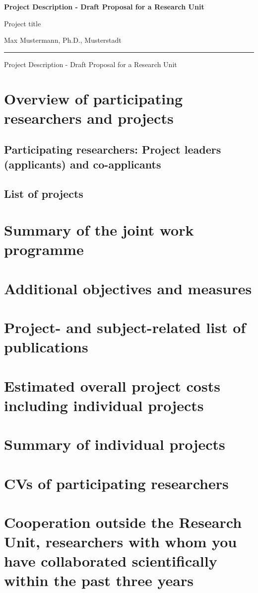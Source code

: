 \documentclass{scrartcl}
\newcommand{\spokesperson}{Max Mustermann, Ph.D., Musterstadt}
\newcommand{\project}{Project title}
\begin{document}
{\raggedright{} \normalsize \bfseries
	Project Description - Draft Proposal for a Research Unit \par
    \project{} \par
    \spokesperson{} \par
	\rule{\textwidth}{0.5pt} \par
	Project Description - Draft Proposal for a Research Unit
}

\section{Overview of participating researchers and projects}

\subsection{Participating researchers: Project leaders (applicants) and co-applicants}

\subsection{List of projects}


\section{Summary of the joint work programme}


\section{Additional objectives and measures}


\section{Project- and subject-related list of publications}
\printbibliography[heading=none]


\section{Estimated overall project costs including individual projects}


\section{Summary of individual projects}


\section{CVs of participating researchers}


\section{Cooperation outside the Research Unit, researchers with whom you have collaborated scientifically within the past three years}
\end{document}

